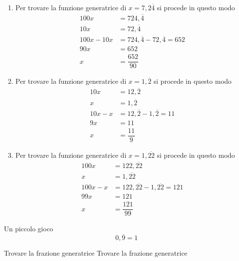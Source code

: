 	\begin{enumerate}
		\item Per trovare la funzione generatrice di $x=7{,}2\overline{4}$ si procede in questo modo
		\begin{align*}
		100x &=724{,}\overline{4}\\
		10x &=72{,}\overline{4}\\
		100x-10x&=724{,}\overline{4}-72{,}\overline{4}=652\\
		90x&=652\\
		x&=\dfrac{652}{90}
		\end{align*}
		\item Per trovare la funzione generatrice di $x=1{,}\overline{2}$ si procede in questo modo
		\begin{align*}
		10x &=12{,}\overline{2}\\
		x &=1{,}\overline{2}\\
		10x-x&=12{,}\overline{2}-1{,}\overline{2}=11\\
		9x&=11\\
		x&=\dfrac{11}{9}
		\end{align*}
		\item Per trovare la funzione generatrice di $x=1{,}\overline{22}$ si procede in questo modo
		\begin{align*}
		100x &=122{,}\overline{22}\\
		x &=1{,}\overline{22}\\
		100x-x&=122{,}\overline{22}-1{,}\overline{22}=121\\
		99x&=121\\
		x&=\dfrac{121}{99}
		\end{align*}
	\end{enumerate}
	Un piccolo gioco 
\[0{,}\overline{9}=1\]
\begin{esempiot}{Trovare la frazione generatrice}{}
Trovare la frazione generatrice
\end{esempiot}
